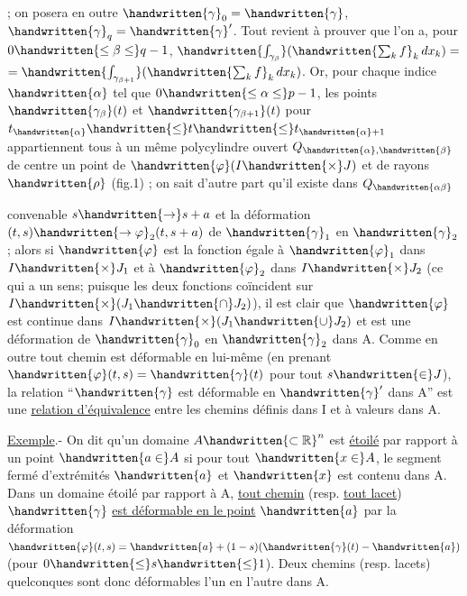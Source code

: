 ; on posera en outre $\handwritten{\gamma}_0=\handwritten{\gamma}$, $\handwritten{\gamma}_q=\handwritten{\gamma}'$. Tout revient à prouver que l'on a, pour $0\handwritten{\leq\beta\leq}q-1$, $\handwritten{\int_{\gamma_\beta}}(\handwritten{\sum_k f}_k\,dx_k)=$ $=\handwritten{\int_{\gamma_{\beta+1}}}(\handwritten{\sum_k f}_k\,dx_k)$. Or, pour chaque indice $\handwritten{\alpha}$ tel que $0\handwritten{\leq\alpha\leq}p-1$, les points $\handwritten{\gamma_\beta}(t)$ et $\handwritten{\gamma_{\beta+1}}(t)$ pour $t_{\handwritten{\alpha}}\handwritten{\leq}t\handwritten{\leq}t_{\handwritten{\alpha}+1}$ appartiennent tous à un même polycylindre ouvert $Q_{\handwritten{\alpha},\handwritten{\beta}}$ de centre un point de $\handwritten{\varphi}(I\handwritten{\times}J)$ et de rayons $\handwritten{\rho}$ (fig.1) ; on sait d'autre part qu'il existe dans $Q_{\handwritten{\alpha\beta}}$



convenable $s\handwritten{\to}s+a$ et la déformation $(t,s)\handwritten{\to\varphi}_2(t,s+a)$ de $\handwritten{\gamma}_1$ en $\handwritten{\gamma}_2$ ; alors si $\handwritten{\varphi}$ est la fonction égale à $\handwritten{\varphi}_1$ dans $I\handwritten{\times}J_1$ et à $\handwritten{\varphi}_2$ dans $I\handwritten{\times}J_2$ (ce qui a un sens; puisque les deux fonctions coïncident sur $I\handwritten{\times}(J_1\handwritten{\cap}J_2)$), il est clair que $\handwritten{\varphi}$ est continue dans $I\handwritten{\times}(J_1\handwritten{\cup}J_2)$ et est une déformation de $\handwritten{\gamma}_0$ en $\handwritten{\gamma}_2$ dans A. Comme en outre tout chemin est déformable en lui-même (en prenant $\handwritten{\varphi}(t,s)=\handwritten{\gamma}(t)$ pour tout $s\handwritten{\in}J$), la relation ``$\handwritten{\gamma}$ est déformable en $\handwritten{\gamma}'$ dans A'' est une \uline{relation d'équivalence} entre les chemins définis dans I et à valeurs dans A.

\uline{Exemple}.- On dit qu'un domaine $A\handwritten{\subset\mathbb{R}}^n$ est \uline{étoilé} par rapport à un point $\handwritten{a\in}A$ si pour tout $\handwritten{x\in}A$, le segment fermé d'extrémités $\handwritten{a}$ et $\handwritten{x}$ est contenu dans A. Dans un domaine étoilé par rapport à A, \uline{tout chemin} (resp. \uline{tout lacet}) $\handwritten{\gamma}$ \uline{est déformable en le point} $\handwritten{a}$ par la déformation $\handwritten{\varphi}(t,s)=\handwritten{a}+(1-s)(\handwritten{\gamma}(t)-\handwritten{a})$ (pour $0\handwritten{\leq}s\handwritten{\leq}1$). Deux chemins (resp. lacets) quelconques sont donc déformables l'un en l'autre dans A.

